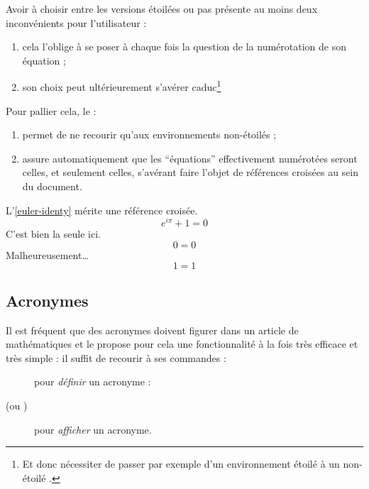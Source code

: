 Avoir à choisir entre les versions étoilées ou pas présente au moins deux
inconvénients pour l'utilisateur :
\begin{enumerate}
\item cela l'oblige à se poser à chaque fois la question de la
  numérotation de son équation ;
\item son choix peut ultérieurement s'avérer caduc\footnote{Et donc nécessiter
    de passer par exemple d'un environnement étoilé à un non-étoilé .}
\end{enumerate}
Pour pallier cela, le  :
\begin{enumerate}
\item permet de ne recourir qu'aux environnements non-étoilés ;
\item assure automatiquement que les \enquote{équations} effectivement
  numérotées seront celles, et seulement celles, s'avérant faire l'objet de
  références croisées au sein du document.
\end{enumerate}

\begin{bodycode}[listing and text,listing options={deletekeywords={label}}]
L'\vref{euler-identy} mérite une référence croisée.
\begin{equation}\label{euler-identy}
  e^{i\pi}+1=0
\end{equation}
C'est bien la seule ici.
\begin{equation}\label{not-interesting}
  0=0
\end{equation}
Malheureusement\dots
\begin{equation}
  1=1
\end{equation}
\end{bodycode}

\subsection{Acronymes}
\label{sec:acronymes}

Il est fréquent que des acronymes doivent figurer dans un article de
mathématiques et le  propose pour cela une fonctionnalité
à la fois très efficace et très simple : il suffit de recourir à ses commandes :
\begin{description}
\item[] pour \emph{définir} un acronyme :
\item[ (ou )] pour \emph{afficher} un acronyme.
\end{description}

